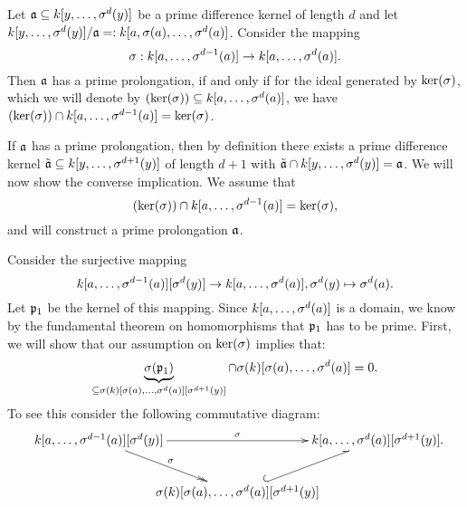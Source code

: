  
\begin{prop}
Let $\mathfrak{a} \subseteq k[y,\ldots,\sigma^d(y)]$ be a prime difference kernel of length $d$ and let $k[y,\ldots,\sigma^d(y)]/\mathfrak{a} =: k[a,\sigma(a),\ldots,\sigma^d(a)]$. Consider the mapping 
\[ \sigma: k[a,\ldots,\sigma^{d-1}(a)] \rightarrow k[a,\ldots,\sigma^d(a)]. \]
Then $\mathfrak{a}$ has a prime prolongation, if and only if for the ideal generated by $\operatorname{ker}(\sigma)$, which we will denote by $(\operatorname{ker}(\sigma)) \subseteq k[a,\ldots,\sigma^d(a)]$, we have \\ $(\operatorname{ker}(\sigma)) \cap k[a,\ldots,\sigma^{d-1}(a)] = \operatorname{ker}(\sigma)$. 
\begin{bew}
If $\mathfrak{a}$ has a prime prolongation, then by definition there exists a prime difference kernel $\tilde {\mathfrak{a}} \subseteq k[y,\ldots,\sigma^{d+1}(y)]$ of length $d+1$ with $\tilde {\mathfrak{a}} \cap k[y,\ldots,\sigma^d(y)] = \mathfrak{a}$.
We will now show the converse implication. We assume that $$(\operatorname{ker}(\sigma)) \cap k[a,\ldots,\sigma^{d-1}(a)] = \operatorname{ker}(\sigma),$$ and will construct a prime prolongation $\mathfrak{a}$.

Consider the surjective mapping 
\[ k[a,\ldots,\sigma^{d-1}(a)][\sigma^d(y)] \rightarrow k[a,\ldots,\sigma^d(a)], \sigma^d(y) \mapsto \sigma^d(a). \]
Let $\mathfrak{p}_1$ be the kernel of this mapping. Since $k[a,\ldots,\sigma^d(a)]$ is a domain, we know by the fundamental theorem on homomorphisms that $\mathfrak{p}_1$ has to be prime. 
First, we will show that our assumption on $\operatorname{ker}(\sigma)$ implies that:
\begin{equation}\label{skercapsk} \underbrace{\sigma(\mathfrak{p}_1)}_{\subseteq \sigma(k)[\sigma(a),\ldots,\sigma^d(a)][\sigma^{d+1}(y)]} \cap \sigma(k)[\sigma(a),\ldots,\sigma^d(a)] = 0. \end{equation}
To see this consider the following commutative diagram:
\[
\begin{xy}
\xymatrixcolsep{-1pc}
 \xymatrix{
      k[a,\ldots,\s^{d-1}(a)][\s^d(y)] \ar[rr]^\s \ar@{->>}[rd]^\s  &     &  k[a,\ldots,\s^d(a)][\s^{d+1}(y)]   \\
      &  \s(k)[\s(a),\ldots,\s^d(a)][\s^{d+1}(y)] \ar@^{(->}[ur] &  }
\end{xy}.
\]


\end{bew}
\end{prop}
